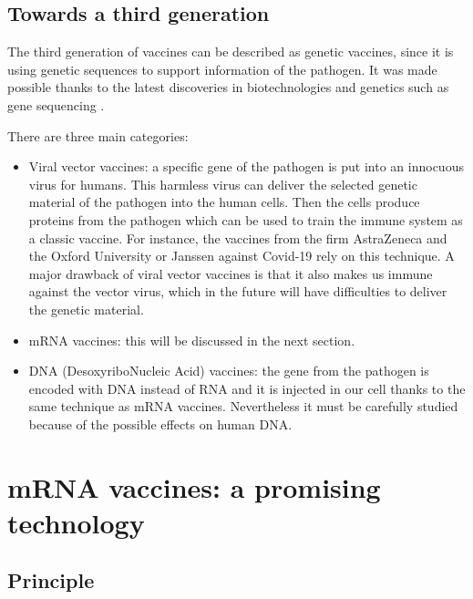 \documentclass{article}
\begin{document}
        \subsection{Towards a third generation}

            The third generation of vaccines can be described as genetic vaccines, since it is using genetic sequences to support information of the pathogen. 
            It was made possible thanks to the latest discoveries in biotechnologies and genetics such as gene sequencing \autocite{chavdaDNAVaccinesSARSCoV22021}.  

            There are three main categories:
            \begin{itemize}
                \item Viral vector vaccines: a specific gene of the pathogen is put into an innocuous virus for humans. 
                        This harmless virus can deliver the selected genetic material of the pathogen into the human cells.
                        Then the cells produce proteins from the pathogen which can be used to train the immune system as a classic vaccine.
                        For instance, the vaccines from the firm AstraZeneca and the Oxford University or Janssen against Covid-19 rely on this technique.
                        A major drawback of viral vector vaccines is that it also makes us immune against the vector virus, 
                            which in the future will have difficulties to deliver the genetic material.
                \item mRNA vaccines: this will be discussed in the next section.
                \item DNA (DesoxyriboNucleic Acid) vaccines: the gene from the pathogen is encoded with DNA instead of RNA
                    and it is injected in our cell thanks to the same technique as mRNA vaccines.
                    Nevertheless it must be carefully studied because of the possible effects on human DNA.
            \end{itemize}


    \section{mRNA vaccines: a promising technology}

        \subsection{Principle}
\end{document}
